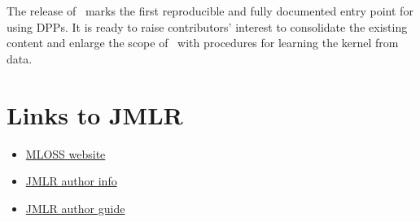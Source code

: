 \documentclass[twoside,11pt]{article}
\begin{document}
The release of \DPPy\ marks the first reproducible and fully documented entry point for using DPPs. It is ready to raise contributors' interest to consolidate the existing content and enlarge the scope of \DPPy\ \eg with procedures for learning the kernel from data.


{\small
{}}




\section{Links to JMLR } %
\label{sec:links_to_jmlr_}

  \begin{itemize}
    \item \href{http://www.jmlr.org/mloss/mloss-info.html}{MLOSS website}
    \item \href{http://jmlr.csail.mit.edu/author-info.html}{JMLR author info}
    \item \href{http://www.jmlr.org/format/authors-guide.html}{JMLR author guide}
  \end{itemize}









\end{document}
